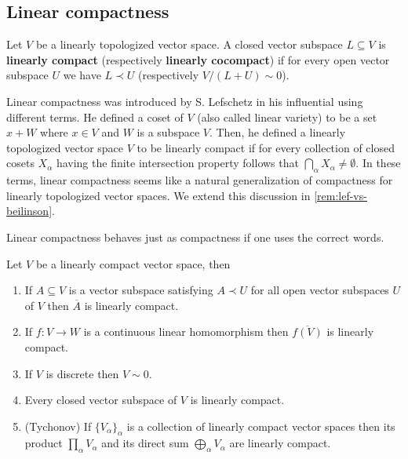 \subsection*{Linear compactness}
\begin{definition}\label{def:linear_compactness}
	Let $V$ be a linearly topologized vector space. A closed vector subspace $L \subseteq V$ is \textbf{linearly compact} (respectively \textbf{linearly cocompact}) if for every open vector subspace $U$ we have $L \prec U$ (respectively $V/(L+U) \sim 0$). 
\end{definition}
\begin{remark}\label{rem:lefschetz-linear-compactness}
	Linear compactness was introduced by S. Lefschetz in his influential \cite{Lefschetz-Alg-Top} using different terms. He defined a coset of $V$ (also called linear variety) to be a set $x + W$ where $x\in V$ and $W$ is a subspace $V$. Then, he defined a linearly topologized vector space $V$ to be linearly compact if for every collection of closed cosets $X_{\alpha}$ having the finite intersection property follows that $\bigcap_{\alpha} X_{\alpha} \neq \emptyset$. In these terms, linear compactness seems like a natural generalization of compactness for linearly topologized vector spaces. We extend this discussion in \cref{rem:lef-vs-beilinson}.
\end{remark}
Linear compactness behaves just as compactness if one uses the correct words.
\begin{theorem}\label{thm:linear_compactness_properties}
	Let $V$ be a linearly compact vector space, then
	\begin{enumerate}[label = (\alph*)]
		\item If $A \subseteq V$ is a vector subspace satisfying $A \prec U$ for all open vector subspaces $U$ of $V$ then $\overline{A}$ is linearly compact.
		\item If $f\colon V \to W$ is a continuous linear homomorphism then $\overline{f(V)}$ is linearly compact.
		\item If $V$ is discrete then $V \sim 0$.
		\item Every closed vector subspace of $V$ is linearly compact.
		\item (Tychonov) If $\{V_{\alpha}\}_{\alpha}$ is a collection of linearly compact vector spaces then its product $\prod_{\alpha} V_{\alpha}$ and its direct sum $\bigoplus_{\alpha}V_{\alpha}$ are linearly compact.
	\end{enumerate}
\end{theorem}
